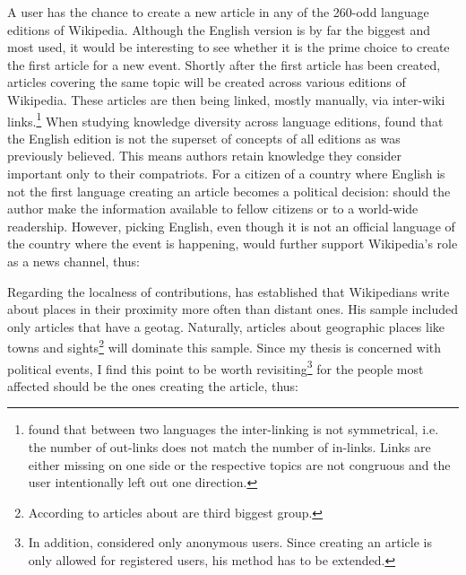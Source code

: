 

A user has the chance to create a new article in any of the 260-odd language editions of Wikipedia.
Although the English version is by far the biggest and most used, it would be interesting to see whether it is the prime choice to create the first article for a new event.
Shortly after the first article has been created, articles covering the same topic will be created across various editions of Wikipedia.
These articles are then being linked, mostly manually, via inter-wiki links.\footnote{\textcite{adar2009information} found that between two languages the inter-linking is not symmetrical, i.e. the number of out-links does not match the number of in-links. Links are either missing on one side or the respective topics are not congruous and the user intentionally left out one direction.}
When studying knowledge diversity across language editions, \textcite{hecht2010tower} found that the English edition is not the superset of concepts of all editions as was previously believed.
This means authors retain knowledge they consider important only to their compatriots. 
For a citizen of a country where English is not the first language creating an article becomes a political decision: should the author make the information available to fellow citizens or to a world-wide readership.
However, picking English, even though it is not an official language of the country where the event is happening, would further support Wikipedia's role as a news channel, thus:


Regarding the localness of contributions, \textcite[57]{hardy2011volunteered} has established that Wikipedians write about places in their proximity more often than distant ones.
His sample included only articles that have a geotag.
Naturally, articles about geographic places like towns and sights\footnote{According to \textcite{kittur2009s} articles about  are third biggest group.} will dominate this sample.
Since my thesis is concerned with political events, I find this point to be worth revisiting\footnote{In addition, \textcite[61]{hardy2011volunteered} considered only anonymous users. Since creating an article is only allowed for registered users, his method has to be extended.} for the people most affected should be the ones creating the article, thus:


